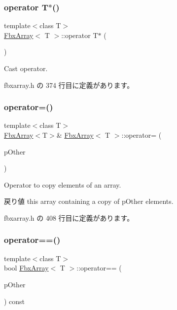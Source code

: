 \subsubsection{\texorpdfstring{operator T$\ast$()}{operator T*()}}
{\footnotesize\ttfamily template$<$class T$>$ \\
\hyperlink{class_fbx_array}{Fbx\+Array}$<$ T $>$\+::operator T$\ast$ (\begin{DoxyParamCaption}{ }\end{DoxyParamCaption})\hspace{0.3cm}{\ttfamily [inline]}}



Cast operator. 



 fbxarray.\+h の 374 行目に定義があります。

\mbox{\label{class_fbx_array_a44222dea1bbe2627872dce87b633dcb5}} 
\subsubsection{\texorpdfstring{operator=()}{operator=()}}
{\footnotesize\ttfamily template$<$class T$>$ \\
\hyperlink{class_fbx_array}{Fbx\+Array}$<$T$>$\& \hyperlink{class_fbx_array}{Fbx\+Array}$<$ T $>$\+::operator= (\begin{DoxyParamCaption}\item[{const \hyperlink{class_fbx_array}{Fbx\+Array}$<$ T $>$ \&}]{p\+Other }\end{DoxyParamCaption})\hspace{0.3cm}{\ttfamily [inline]}}

Operator to copy elements of an array. \begin{DoxyReturn}{戻り値}
this array containing a copy of p\+Other elements. 
\end{DoxyReturn}


 fbxarray.\+h の 408 行目に定義があります。

\mbox{\label{class_fbx_array_ad0e83571bb944be38ce3bba7079be185}} 
\subsubsection{\texorpdfstring{operator==()}{operator==()}}
{\footnotesize\ttfamily template$<$class T$>$ \\
bool \hyperlink{class_fbx_array}{Fbx\+Array}$<$ T $>$\+::operator== (\begin{DoxyParamCaption}\item[{const \hyperlink{class_fbx_array}{Fbx\+Array}$<$ T $>$ \&}]{p\+Other }\end{DoxyParamCaption}) const\hspace{0.3cm}{\ttfamily [inline]}}

